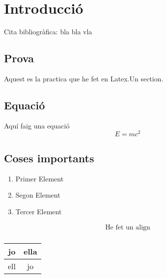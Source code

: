 \chapter{Introducció}
\label{c:intro}

Cita bibliogràfica: \cite{TP} bla bla vla
\section {Prova}
Aquest es la practica que he fet en Latex.Un section.
\section{Equació}
Aquí faig una equació $$ E = mc^2 $$

\section{Coses importants}
\begin{enumerate}
  \item Primer Element
  \item Segon Element
  \item Tercer Element
\end{enumerate}

\date{\today}


\begin{align}
  \text{He fet un align} \\
\end{align}

\begin{tabular}{|c|c|}
 \hline
 jo & ella \\
 \hline
 ell & jo \\
 \hline
\end{tabular}

